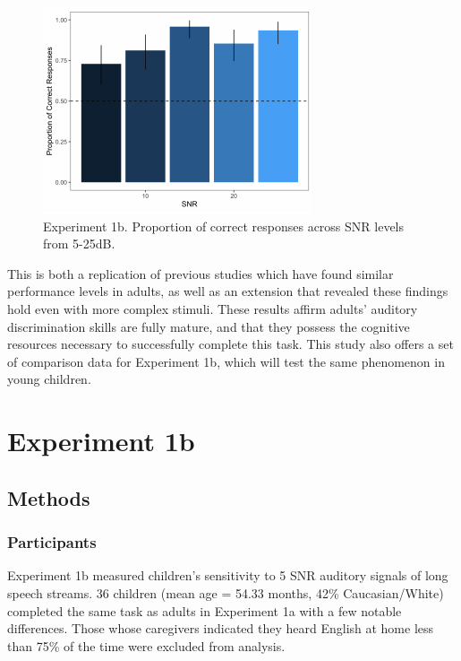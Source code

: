 \documentclass[10pt, letterpaper]{article}
\newenvironment{CodeChunk}{}{}
\begin{document}
\begin{CodeChunk}
\begin{figure}[H]

{\centering \includegraphics{figs/image 2-1} 

}

\caption[Experiment 1b]{Experiment 1b. Proportion of correct responses across SNR levels from 5-25dB.}\label{fig:image 2}
\end{figure}
\end{CodeChunk}

This is both a replication of previous studies which have found similar
performance levels in adults, as well as an extension that revealed
these findings hold even with more complex stimuli. These results affirm
adults' auditory discrimination skills are fully mature, and that they
possess the cognitive resources necessary to successfully complete this
task. This study also offers a set of comparison data for Experiment 1b,
which will test the same phenomenon in young children.

\hypertarget{experiment-1b}{%
\section{\texorpdfstring{\textbf{Experiment
1b}}{Experiment 1b}}\label{experiment-1b}}

\hypertarget{methods-1}{%
\subsection{\texorpdfstring{\textbf{Methods}}{Methods}}\label{methods-1}}

\hypertarget{participants-1}{%
\subsubsection{Participants}\label{participants-1}}

Experiment 1b measured children's sensitivity to 5 SNR auditory signals
of long speech streams. 36 children (mean age = 54.33 months, 42\%
Caucasian/White) completed the same task as adults in Experiment 1a with
a few notable differences. Those whose caregivers indicated they heard
English at home less than 75\% of the time were excluded from analysis.
\end{document}
